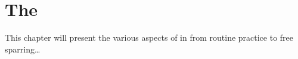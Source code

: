 \chapter{The \Yi}\label{ch:yi}

This chapter will present the various aspects of \Yi{} in \Taijijian{} from routine practice to free sparring\ldots